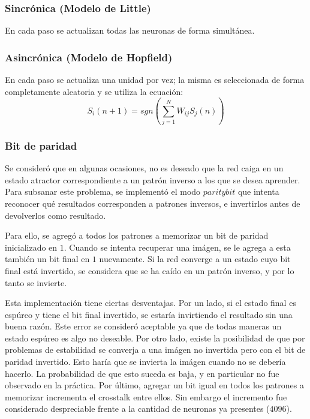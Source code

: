 \documentclass[%
    final,
    reprint,
    notitlepage,
    narroweqnarray,
    inline,
    twoside,
    invited
    ]{ieee}
\begin{document}
\subsubsection{Sincrónica (Modelo de Little)}

\par En cada paso se actualizan todas las neuronas de forma simultánea.\\



\subsubsection{Asincrónica (Modelo de Hopfield)}

\par En cada paso se actualiza una unidad por vez; la misma es seleccionada de forma completamente aleatoria y se utiliza la ecuación:
\begin{equation}
\label{updateRule}
S_i(n+1) = sgn\left(\sum_{j=1}^{N}{W_{ij}S_j(n)}\right)
\end{equation}


\subsubsection{Bit de paridad}

\par Se consideró que en algunas ocasiones, no es deseado que la red caiga en un estado atractor correspondiente a un patrón inverso a 
los que se desea aprender. Para subsanar este problema, se implementó el modo $paritybit$ que intenta 
reconocer qué resultados corresponden a patrones inversos, e invertirlos antes de devolverlos 
como resultado.

\par Para ello, se agregó a todos los patrones a memorizar un bit de paridad inicializado en $1$. Cuando 
se intenta recuperar una imágen, se le agrega a esta también un bit final en $1$ nuevamente. Si la red 
converge a un estado cuyo bit final está invertido, se considera que se ha caído en un patrón inverso, 
y por lo tanto se invierte.

\par Esta implementación tiene ciertas desventajas. Por un lado, si el estado final es espúreo y tiene 
 el bit final invertido, se estaría invirtiendo el resultado sin una buena razón. Este error se consideró 
aceptable ya que de todas maneras un estado espúreo es algo no deseable. Por otro lado, existe la posibilidad 
de que por problemas de estabilidad se converja a una imágen no invertida pero con el bit de paridad 
invertido. Esto haría que se invierta la imágen cuando no se debería hacerlo. La probabilidad de que 
esto suceda es baja, y en particular no fue observado en la práctica. Por último, agregar un bit igual 
en todos los patrones a memorizar incrementa el crosstalk entre ellos. Sin embargo el incremento fue 
considerado despreciable frente a la cantidad de neuronas ya presentes ($4096$).
\end{document}
